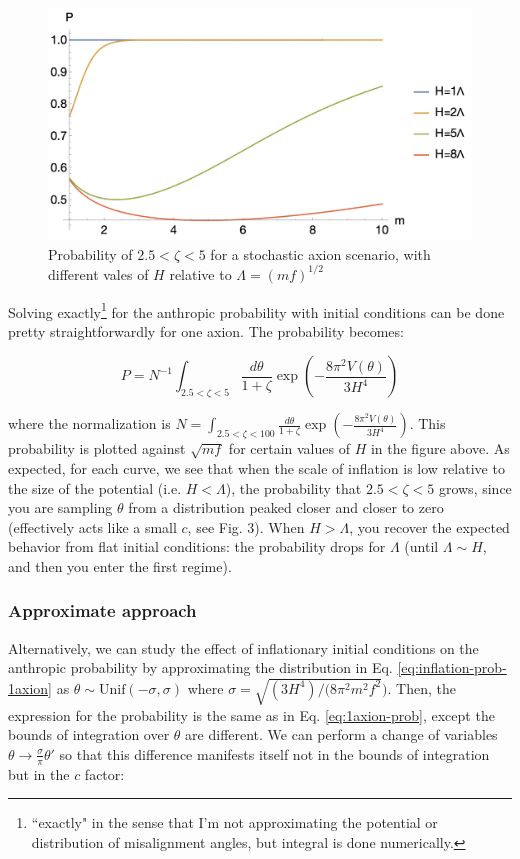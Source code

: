 \documentclass{article}
\begin{document}
\begin{figure}[h]
    \centering
    \includegraphics[width=1
\linewidth]{figs/Screenshot 2025-07-14 at 17.00.25.png}
    \caption{Probability of $2.5<\zeta<5$ for a stochastic axion scenario, with different vales of $H$ relative to $\Lambda = (mf)^{1/2}$}
    \label{fig:enter-label}
\end{figure}

Solving exactly\footnote{``exactly" in the sense that I'm not approximating the potential or distribution of misalignment angles, but integral is done numerically.} for the anthropic probability with initial conditions can be done pretty straightforwardly for one axion. The probability becomes:

\begin{equation}
    \label{eq:inflation-prob-1axion}
    P = N^{-1}\int_{2.5<\zeta<5} \frac{d\theta}{1+\zeta} \exp{\left(-\frac{8\pi^2V(\theta)}{3H^4}\right)}
\end{equation}

\noindent where the normalization is $N = \int_{2.5<\zeta<100} \frac{d\theta}{1+\zeta}\exp{\left(-\frac{8\pi^2V(\theta)}{3H^4}\right)}$. This probability is plotted against $\sqrt{mf}$ for certain values of $H$ in the figure above. As expected, for each curve, we see that when the scale of inflation is low relative to the size of the potential (i.e. $H<\Lambda$), the probability that $2.5<\zeta<5$ grows, since you are sampling $\theta$ from a distribution peaked closer and closer to zero (effectively acts like a small $c$, see Fig. 3). When $H>\Lambda$, you recover the expected behavior from flat initial conditions: the probability drops for $\Lambda$ (until $\Lambda \sim H$, and then you enter the first regime).


\subsubsection{Approximate approach}
Alternatively, we can study the effect of inflationary initial conditions on the anthropic probability by approximating the distribution in Eq. \eqref{eq:inflation-prob-1axion} as $\theta \sim \text{Unif}(-\sigma,\sigma)$ where $\sigma = \sqrt{(3H^4)/(8\pi^2m^2f^2})$. Then, the expression for the probability is the same as in Eq. \eqref{eq:1axion-prob}, except the bounds of integration over $\theta$ are different. We can perform a change of variables $\theta\rightarrow\frac{\sigma}{\pi}\theta'$ so that this difference manifests itself not in the bounds of integration but in the $c$ factor:
\end{document}
